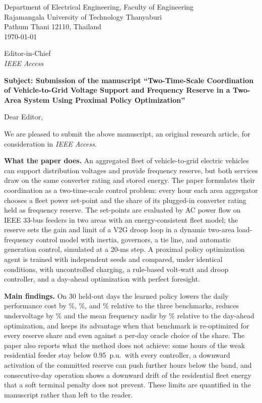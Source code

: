 \documentclass[11pt,a4paper]{article}
\begin{document}
\noindent
Department of Electrical Engineering, Faculty of Engineering\\
Rajamangala University of Technology Thanyaburi\\
Pathum Thani 12110, Thailand\\[6pt]
\today

\vspace{8pt}
\noindent
Editor-in-Chief\\
\emph{IEEE Access}

\vspace{8pt}
\noindent
\textbf{Subject: Submission of the manuscript ``Two-Time-Scale Coordination of Vehicle-to-Grid Voltage Support and Frequency Reserve in a Two-Area System Using Proximal Policy Optimization''}

\vspace{6pt}
Dear Editor,

We are pleased to submit the above manuscript, an original research
article, for consideration in \emph{IEEE Access}.

\textbf{What the paper does.} An aggregated fleet of vehicle-to-grid
electric vehicles can support distribution voltages and provide
frequency reserve, but both services draw on the same converter rating
and stored energy. The paper formulates their coordination as a
two-time-scale control problem: every hour each area aggregator chooses
a fleet power set-point and the share of its plugged-in converter rating
held as frequency reserve. The set-points are evaluated by AC power flow
on IEEE 33-bus feeders in two areas with an energy-consistent fleet
model; the reserve sets the gain and limit of a V2G droop loop in a
dynamic two-area load-frequency control model with inertia, governors,
a tie line, and automatic generation control, simulated at a 20-ms
step. A proximal policy optimization agent is trained with \NSeed{}
independent seeds and compared, under identical conditions, with
uncontrolled charging, a rule-based volt-watt and droop controller, and
a day-ahead optimization with perfect foresight.

\textbf{Main findings.} On 30 held-out days the learned policy lowers
the daily performance cost by \TRedCostDAO\%, \TRedCostRB\%, and
\TRedCostUC\% relative to the three benchmarks, reduces undervoltage
by \TRedUvPuHDAO\% and the mean frequency nadir by
\TRedNadirMeanHzDAO\% relative to the day-ahead optimization, and keeps
its advantage when that benchmark is re-optimized for every reserve
share and even against a per-day oracle choice of the share. The paper
also reports what the method does not achieve: some hours of the weak
residential feeder stay below 0.95~p.u.\ with every controller, a
downward activation of the committed reserve can push further hours
below the band, and consecutive-day operation shows a downward drift of
the residential fleet energy that a soft terminal penalty does not
prevent. These limits are quantified in the manuscript rather than left
to the reader.
\end{document}
